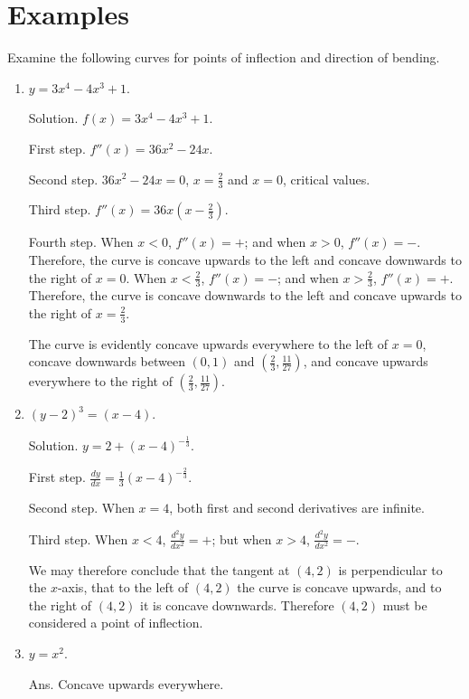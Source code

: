 \section{Examples}

Examine the following curves for points of inflection and direction 
of bending.

\begin{enumerate}

\item
 $y = 3x^4 - 4x^3 + 1$.

Solution. $f(x) = 3x^4 - 4x^3 + 1$.

First step. $f''(x) 	= 36x^2 - 24x$.

Second step. $36x^2 - 24x 	= 0$,
$x = \frac{2}{3}$ and $x = 0$, critical values.

Third step. $f''(x) = 36x(x - \frac{2}{3})$.

Fourth step. 	When $x < 0$, $f''(x) = +$; and when 
$x > 0$, $f''(x) = -$. Therefore, the curve is concave upwards 
to the left and concave downwards to the right of $x = 0$. %
When $x < \frac{2}{3}$, $f''(x) = -$; and when $x > \frac{2}{3}$, $f''(x) = +$.
Therefore, the curve is concave downwards to the left and 
concave upwards to the right of $x = \frac{2}{3}$. %

The curve is evidently concave upwards everywhere to the 
left of $x=0$, concave downwards between $(0,1)$ and 
$(\frac{2}{3}, \frac{11}{27})$, and concave upwards everywhere to the 
right of $(\frac{2}{3}, \frac{11}{27})$.

\item
$(y - 2)^3 = (x - 4)$.

Solution. $y 	= 2 + (x - 4)^{-\frac{1}{3}}$.

First step. $\frac{dy}{dx} 	= \frac{1}{3}(x - 4)^{-\frac{2}{3}}$.

Second step. 	When $x = 4$, both first and second derivatives are infinite.

Third step. 	When $x < 4$, $\frac{d^2 y}{dx^2} = +$; but when 
$x > 4$, $\frac{d^2 y}{dx^2} = -$.

We may therefore conclude that the tangent at $(4, 2)$ is 
perpendicular to the $x$-axis, that to the left of $(4,2)$ the curve 
is concave upwards, and to the right of $(4, 2)$ it is concave downwards. 
Therefore $(4, 2)$ must be considered a point of inflection.

\item
$y = x^2$. 	

Ans. 	Concave upwards everywhere.


\end{enumerate}
